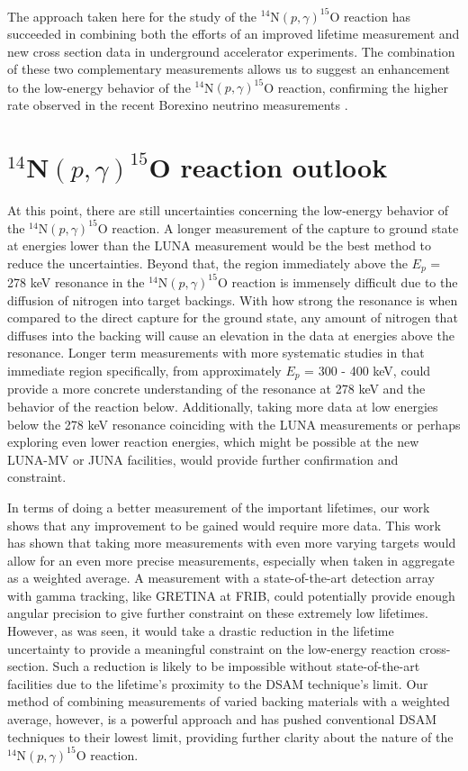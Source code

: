 The approach taken here for the study of the $^{14}$N$(p,\gamma)^{15}$O reaction has succeeded in combining both the efforts of an improved lifetime measurement and new cross section data in underground accelerator experiments. The combination of these two complementary measurements allows us to suggest an enhancement to the low-energy behavior of the $^{14}$N$(p,\gamma)^{15}$O reaction, confirming the higher rate observed in the recent Borexino neutrino measurements \cite{agostini2020direct}. 


\section{$^{14}$N$\left( p,\gamma \right) ^{15}$O reaction outlook}
\label{sec: outlook}

At this point, there are still uncertainties concerning the low-energy behavior of the $^{14}$N$\left( p,\gamma \right) ^{15}$O reaction. A longer measurement of the capture to ground state at energies lower than the LUNA measurement would be the best method to reduce the uncertainties. Beyond that, the region immediately above the $E_{p}$ = 278 keV resonance in the $^{14}$N$\left( p,\gamma \right) ^{15}$O reaction is immensely difficult due to the diffusion of nitrogen into target backings. With how strong the resonance is when compared to the direct capture for the ground state, any amount of nitrogen that diffuses into the backing will cause an elevation in the data at energies above the resonance. Longer term measurements with more systematic studies in that immediate region specifically, from approximately $E_{p}$ = 300 - 400 keV, could provide a more concrete understanding of the resonance at 278 keV and the behavior of the reaction below. Additionally, taking more data at low energies below the 278 keV resonance coinciding with the LUNA measurements or perhaps exploring even lower reaction energies, which might be possible at the new LUNA-MV or JUNA facilities, would provide further confirmation and constraint. 

In terms of doing a better measurement of the important lifetimes, our work shows that any improvement to be gained would require more data. This work has shown that taking more measurements with even more varying targets would allow for an even more precise measurements, especially when taken in aggregate as a weighted average. A measurement with a state-of-the-art detection array with gamma tracking, like GRETINA at FRIB, could potentially provide enough angular precision to give further constraint on these extremely low lifetimes. However, as was seen, it would take a drastic reduction in the lifetime uncertainty to provide a meaningful constraint on the low-energy reaction cross-section. Such a reduction is likely to be impossible without state-of-the-art facilities due to the lifetime's proximity to the DSAM technique's limit. Our method of combining measurements of varied backing materials with a weighted average, however, is a powerful approach and has pushed conventional DSAM techniques to their lowest limit, providing further clarity about the nature of the $^{14}$N$\left( p,\gamma \right) ^{15}$O reaction. 



%
% 
% 

